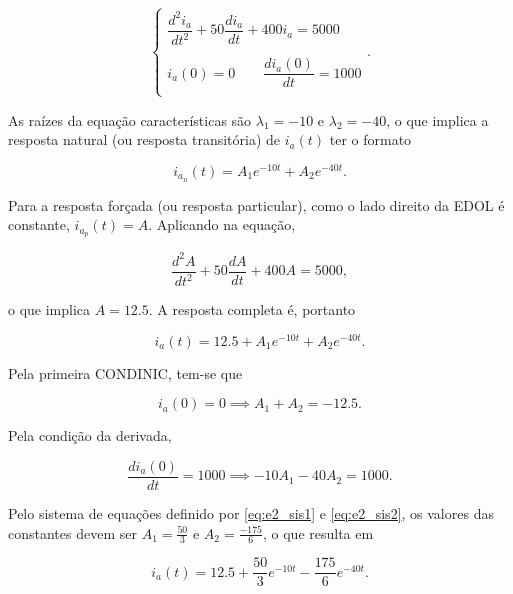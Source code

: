 \documentclass{article}
\numberwithin{equation}{section}
\let\dfr\dfrac
\begin{document}
\begin{equation*}
    \begin{cases}
        \dfr{d^2i_a}{dt^2} + 50 \dfr{di_a}{dt} + 400i_a = 5000
        \\ \\
        i_a(0) = 0 \qquad \dfr{di_a(0)}{dt} = 1000
        \\
    \end{cases}
    .
\end{equation*}

\noindent As raízes da equação características são $\lambda_1=-10$ e $\lambda_2=-40$, o que implica a resposta natural (ou resposta transitória) de $i_a(t)$ ter o formato

\begin{equation*}
    i_{a_n}(t) = A_1e^{-10t} + A_2e^{-40t}.
\end{equation*}

\noindent Para a resposta forçada (ou resposta particular), como o lado direito da EDOL é constante, $i_{a_p}(t) = A$. Aplicando na equação,

\begin{equation*}
    \dfr{d^2A}{dt^2} + 50 \dfr{dA}{dt} + 400A = 5000,
\end{equation*}

\noindent o que implica $A = 12.5$. A resposta completa é, portanto

\begin{equation*}
    i_a(t) = 12.5 + A_1e^{-10t} + A_2e^{-40t}.
\end{equation*}

\noindent Pela primeira CONDINIC, tem-se que

\begin{equation}
    i_a(0) = 0 \implies A_1 + A_2 = -12.5. \label{eq:e2_sis1}
\end{equation}

\noindent Pela condição da derivada,

\begin{equation}
    \dfr{di_a(0)}{dt} = 1000 \implies -10A_1 - 40A_2 = 1000 \label{eq:e2_sis2}.
\end{equation}

Pelo sistema de equações definido por \eqref{eq:e2_sis1} e \eqref{eq:e2_sis2}, os valores das constantes devem ser $A_1 = \frac{50}{3}$ e $A_2 = \frac{-175}{6}$, o que resulta em

\begin{equation}
    i_a(t) = 12.5 + \dfr{50}{3}e^{-10t} - \dfr{175}{6}e^{-40t}. \label{eq:e2_ia}
\end{equation}
\end{document}
